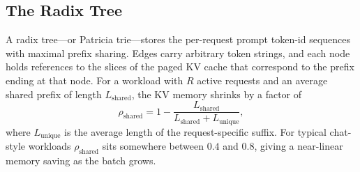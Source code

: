 \subsection{The Radix Tree}\label{sec:sglang_radix}
A radix tree---or Patricia trie---stores the per-request prompt
token-id sequences with maximal prefix sharing. Edges carry
arbitrary token strings, and each node holds references to the
slices of the paged KV cache that correspond to the prefix ending
at that node. For a workload with $R$ active requests and an
average shared prefix of length $L_{\text{shared}}$, the KV memory
shrinks by a factor of
\begin{equation}
    \rho_{\text{shared}} =
    1 - \frac{L_{\text{shared}}}{L_{\text{shared}} + L_{\text{unique}}},
\end{equation}
where $L_{\text{unique}}$ is the average length of the
request-specific suffix. For typical chat-style workloads
$\rho_{\text{shared}}$ sits somewhere between $0.4$ and $0.8$,
giving a near-linear memory saving as the batch grows.

